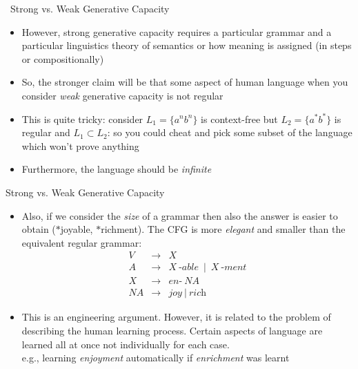 \documentclass[landscape]{slides}
\def\dbend{{\manual\char127}}   %
\begin{document}
\begin{slide}{\dbend\ Strong vs. Weak Generative Capacity}
\begin{itemize}
\item However, strong generative capacity requires a particular
grammar and a particular linguistics theory of semantics or how
meaning is assigned (in steps or compositionally)
\item So, the stronger claim will be that some aspect of human
language when you consider {\em weak} generative capacity is not
regular
\item This is quite tricky: consider $L_1 = \{ a^n b^n \}$ is
context-free but $L_2 = \{ a^\ast b^\ast \}$ is regular and $L_1
\subset L_2$: so you could cheat and pick some subset of the language
which won't prove anything
\item Furthermore, the language should be {\em infinite}
\end{itemize}
\end{slide}

\begin{slide}{Strong vs. Weak Generative Capacity}
\begin{itemize}
\item Also, if we consider the {\em size} of a grammar then also the
answer is easier to obtain ($\ast$joyable, $\ast$richment). The CFG is
more {\em elegant} and smaller than the equivalent regular grammar:
\begin{eqnarray}
V &\rightarrow& X \nonumber \\
A &\rightarrow& X\ \textit{-able}~\mid~X\ \textit{-ment}\nonumber \\
X &\rightarrow& \textit{en-}\ NA \nonumber \\
NA &\rightarrow& \textit{joy}~\mid~\textit{rich} \nonumber
\end{eqnarray}
\item This is an engineering argument. However, it is related to the
problem of describing the human learning process. Certain aspects of
language are learned all at once not individually for each case.\\
{e.g., learning {\em enjoyment} automatically if {\em enrichment} was
learnt}
\end{itemize}
\end{slide}
\end{document}
